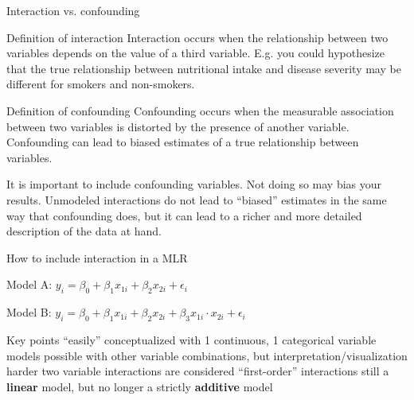 \documentclass[table]{beamer}\usepackage[]{graphicx}\usepackage[]{color}
\begin{document}
\begin{frame}{Interaction vs. confounding}

\begin{block}{Definition of interaction}
Interaction occurs when the relationship between two variables depends on the value of a third variable. E.g. you could hypothesize that the true relationship between nutritional intake and disease severity may be different for smokers and non-smokers.
\end{block}

\begin{block}{Definition of confounding}
Confounding occurs when the measurable association between two variables is distorted by the presence of another variable. Confounding can lead to biased estimates of a true relationship between variables.
\end{block}

\bi
    \myitem It is important to include confounding variables. Not doing so may bias your results.
    \myitem Unmodeled interactions do not lead to ``biased'' estimates in the same way that confounding does, but it can lead to a richer and more detailed description of the data at hand. 
\ei


\end{frame}

% 
% 
% 

\begin{frame}{How to include interaction in a MLR}


Model A: $ y_i = \beta_0 + \beta_1 x_{1i} + \beta_2 x_{2i} + \epsilon_i$


Model B: $ y_i = \beta_0 + \beta_1 x_{1i} + \beta_2 x_{2i} + \beta_3 x_{1i}\cdot x_{2i} + \epsilon_i$

\vspace{4em}

\begin{block}{Key points}
\bi
        \myitem ``easily'' conceptualized with 1 continuous, 1 categorical variable
        \myitem models possible with other variable combinations, but interpretation/visualization harder 
        \myitem two variable interactions are considered ``first-order'' interactions 
        \myitem still a {\bf linear} model, but no longer a strictly {\bf additive} model
\ei
\end{block}

\end{frame}
\end{document}
